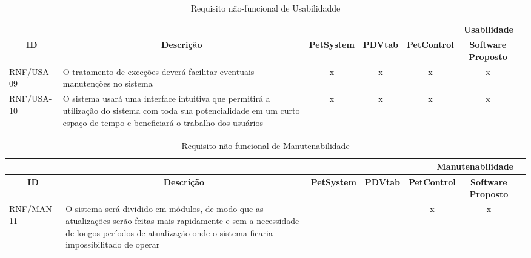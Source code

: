 \documentclass[12pt,openright,twoside,a4paper,english,french,spanish,brazil]{abntex2}
\begin{document}
\begin{landscape}
\begin{table}[!htpb]
\centering
\caption{Requisito não-funcional de Usabilidadde}\label{tab:RNF_USA}
\begin{small} 
\setlength{\tabcolsep}{3pt}
\begin{tabular}{|p{3cm}|p{}|c|c|c|cc|}
\toprule
    \multicolumn{6}{r}{\textbf{Usabilidade}} \\
    \midrule
    \multicolumn{1}{c}{\textbf{ID}} & \multicolumn{1}{c}{\textbf{Descrição}} & \multicolumn{1}{c}{\textbf{PetSystem}} & \multicolumn{1}{c}{\textbf{PDVtab}} & \multicolumn{1}{c}{\textbf{PetControl}} & \multicolumn{1}{c}{\textbf{Software Proposto}} \\
    RNF/USA-09 & O tratamento de exceções deverá facilitar eventuais manutenções no sistema & x & x & x & x \\
    RNF/USA-10 & O sistema usará uma interface intuitiva que permitirá a utilização do sistema com toda sua potencialidade em um curto espaço de tempo e beneficiará o trabalho dos usuários & x & x & x & x \\
    \bottomrule
\end{tabular}%
\end{small}
\end{table}
\begin{table}[!htpb]
\centering
\caption{Requisito não-funcional de Manutenabilidade}\label{tab:RNF_MAN}
\begin{small} 
\setlength{\tabcolsep}{3pt}
\begin{tabular}{|p{3cm}|p{}|c|c|c|cc|}
\toprule
    \multicolumn{6}{r}{\textbf{Manutenabilidade}} \\
    \midrule
    \multicolumn{1}{c}{\textbf{ID}} & \multicolumn{1}{c}{\textbf{Descrição}} & \multicolumn{1}{c}{\textbf{PetSystem}} & \multicolumn{1}{c}{\textbf{PDVtab}} & \multicolumn{1}{c}{\textbf{PetControl}} & \multicolumn{1}{c}{\textbf{Software Proposto}} \\
    RNF/MAN-11 & O sistema será dividido em módulos, de modo que as atualizações serão feitas mais rapidamente e sem a necessidade de longos períodos de atualização onde o sistema ficaria impossibilitado de operar & - & - & x & x \\

\end{tabular}
\end{small}
\end{table}
\end{landscape}
\end{document}

